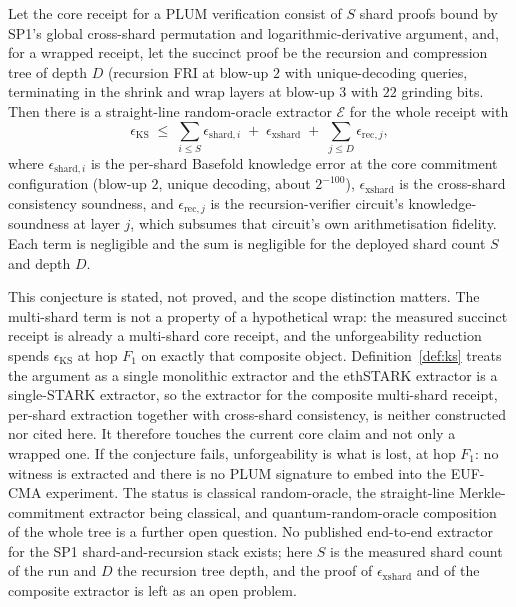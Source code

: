 \begin{conjecture}\label{conj:extract-recursion}
    Let the core receipt for a PLUM verification consist of $S$ shard proofs bound by SP1's global cross-shard permutation and logarithmic-derivative argument, and, for a wrapped receipt, let the succinct proof be the recursion and compression tree of depth $D$ (recursion FRI at blow-up $2$ with unique-decoding queries, terminating in the shrink and wrap layers at blow-up $3$ with $22$ grinding bits. Then there is a straight-line random-oracle extractor $\mathcal E$ for the whole receipt with
    \begin{equation*}
      \epsilon_{\mathrm{KS}}\;\le\;\sum_{i\le S}\epsilon_{\mathrm{shard},i}
      \;+\;\epsilon_{\mathrm{xshard}}\;+\;\sum_{j\le D}\epsilon_{\mathrm{rec},j},
    \end{equation*}
    where $\epsilon_{\mathrm{shard},i}$ is the per-shard Basefold knowledge error at the core commitment configuration (blow-up $2$, unique decoding, about $2^{-100}$), $\epsilon_{\mathrm{xshard}}$ is the cross-shard consistency soundness, and $\epsilon_{\mathrm{rec},j}$ is the recursion-verifier circuit's knowledge-soundness at layer $j$, which subsumes that circuit's own arithmetisation fidelity. Each term is negligible and the sum is negligible for the deployed shard count $S$ and depth $D$.
\end{conjecture}

This conjecture is stated, not proved, and the scope distinction matters. The multi-shard term is not a property of a hypothetical wrap: the measured succinct receipt is already a multi-shard core receipt, and the unforgeability reduction spends $\epsilon_{\mathrm{KS}}$ at hop $F_1$ on exactly that composite object. Definition~\ref{def:ks} treats the argument as a single monolithic extractor and the ethSTARK extractor is a single-STARK extractor, so the extractor for the composite multi-shard receipt, per-shard extraction together with cross-shard consistency, is neither constructed nor cited here. It therefore touches the current core claim and not only a wrapped one. If the conjecture fails, unforgeability is what is lost, at hop $F_1$: no witness is extracted and there is no PLUM signature to embed into the EUF-CMA experiment. The status is classical random-oracle, the straight-line Merkle-commitment extractor being classical, and quantum-random-oracle composition of the whole tree is a further open question. No published end-to-end extractor for the SP1 shard-and-recursion stack exists; here $S$ is the measured shard count of the run and $D$ the recursion tree depth, and the proof of $\epsilon_{\mathrm{xshard}}$ and of the composite extractor is left as an open problem.

